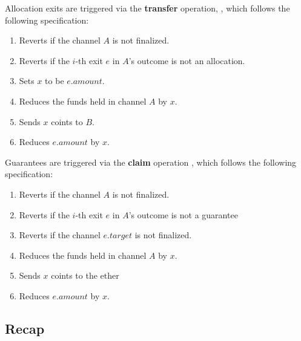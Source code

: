 {}

Allocation exits are triggered via the \textbf{transfer} operation, , which follows the following specification:
\begin{enumerate}
  \item Reverts if the channel $A$ is not finalized.
  \item Reverts if the $i$-th exit $e$ in $A$'s outcome is not an allocation.
  \item Sets $x$ to be $e.amount$.
  \item Reduces the funds held in channel $A$ by $x$. 
  \item Sends $x$ coints to $B$.
  \item Reduces $e.amount$ by $x$.
\end{enumerate} 

Guarantees are triggered via the \textbf{claim} operation , which follows the following specification:
\begin{enumerate}
  \item Reverts if the channel $A$ is not finalized.
  \item Reverts if the $i$-th exit $e$ in $A$'s outcome is not a guarantee
  \item Reverts if the channel $e.target$ is not finalized.
  \item Reduces the funds held in channel $A$ by $x$. 
  \item Sends $x$ coints to the ether
  \item Reduces $e.amount$ by $x$.
\end{enumerate} 


\subsection{Recap}
